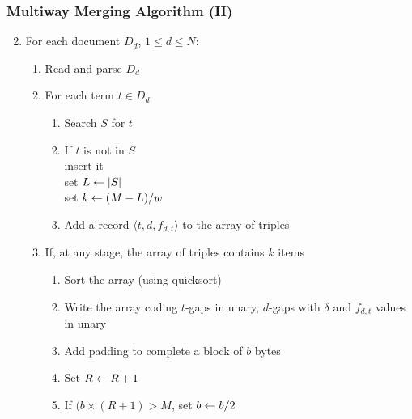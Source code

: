 \documentclass[svgnames]{beamer}
\begin{document}

\begin{frame}
    \frametitle{Multiway Merging Algorithm (II)}
    
    \begin{enumerate}
        \setcounter{enumi}{1}
    \item For each document $D_d$, $1 \leq d \leq N$:
        \begin{enumerate}
        \item Read and parse $D_d$
        \item For each term $t \in D_d$
            \begin{enumerate}
            \item Search $S$ for $t$
            \item If $t$ is not in $S$\\
                insert it\\
                set $L \leftarrow |S|$\\
                set $k \leftarrow (M-L)/w$
            \item Add a record $\langle t,d,f_{d,t} \rangle$ to the array of triples
            \end{enumerate}
        \item If, at any stage, the array of triples contains $k$ items
            \begin{enumerate}
            \item Sort the array (using quicksort)
            \item Write the array coding $t$-gaps in unary, $d$-gaps with $\delta$ and
                $f_{d,t}$ values in unary
            \item Add padding to complete a block of $b$ bytes
            \item Set $R \leftarrow R + 1$
            \item If $(b \times (R+1) > M$, set $b \leftarrow b/2$
            \end{enumerate}
        \end{enumerate}
    \end{enumerate}
\end{frame}

\end{document}
